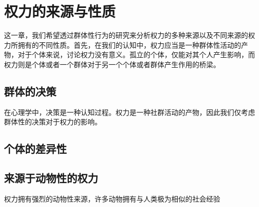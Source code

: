 \documentclass[main.tex]{subfiles}
\begin{document}
\chapter{权力的来源与性质}
这一章，我们希望透过群体性行为的研究来分析权力的多种来源以及不同来源的权力所拥有的不同性质。首先，在我们的认知中，权力应当是一种群体性活动的产物，对于个体来说，讨论权力没有意义。孤立的个体，仅能对其个人产生影响，而权力则是个体或者一个群体对于另一个个体或者群体产生作用的桥梁。

\section{群体的决策}
在心理学中，决策是一种认知过程。权力是一种社群活动的产物，因此我们仅考虑群体性的决策对于权力的影响。

\section{个体的差异性}

\section{来源于动物性的权力}
权力拥有强烈的动物性来源，许多动物拥有与人类极为相似的社会经验
\end{document}
